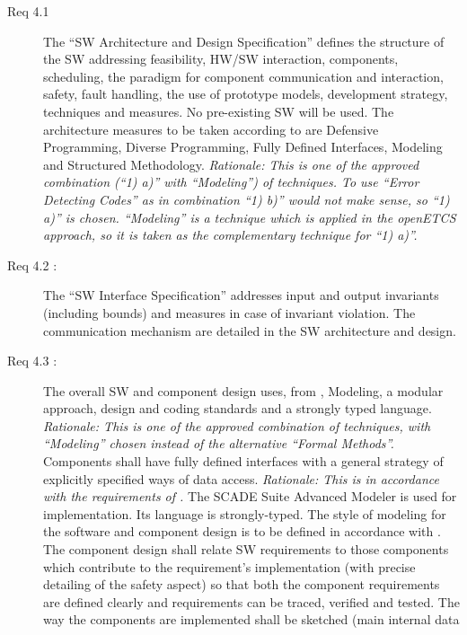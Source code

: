 \documentclass{template/openetcs_article}
\begin{document}
\begin{description}
\item[Req 4.1 {\cite[7.3.4.2 to 7.4.3.17]{EN50128:2011}}] The ``SW
  Architecture and Design Specification'' defines the structure of the
  SW addressing feasibility, HW/SW interaction, components,
  scheduling, the paradigm for component communication and
  interaction, safety, fault handling, the use of prototype models,
  development strategy, techniques and measures. No pre-existing SW
  will be used. The architecture measures to be taken according to
  \cite[A.3]{EN50128:2011} are Defensive Programming, Diverse
  Programming, Fully Defined Interfaces, Modeling and Structured
  Methodology. \emph{Rationale: This is one of the approved
  combination (``1) a)'' with ``Modeling'') of techniques. To use
  ``Error Detecting Codes'' as in combination ``1) b)'' would not make
  sense, so ``1) a)'' is chosen. ``Modeling'' is a technique which is
  applied in the openETCS approach, so it is taken as the
  complementary technique for ``1) a)''.}
\item[Req 4.2 {\cite[7.3.4.18 to 7.4.3.20]{EN50128:2011}}:] The ``SW
  Interface Specification'' addresses input and output invariants
  (including bounds) and measures in case of invariant violation. The
  communication mechanism are detailed in the SW architecture and design.
\item[Req 4.3 {\cite[7.3.4.21 to 7.4.3.24, 7.4.4.1 to
    7.4.4.6]{EN50128:2011}}:] The overall SW and component design
  uses, from \cite[A.4]{EN50128:2011}, Modeling, a modular approach,
  design and coding standards and a strongly typed
  language. \emph{Rationale: This is one of the approved combination
    of techniques, with ``Modeling'' chosen instead of the alternative
    ``Formal Methods''.}  Components shall have fully defined
  interfaces with a general strategy of explicitly specified ways of
  data access. \emph{Rationale: This is in accordance with the
    requirements of \cite[A.20]{EN50128:2011}.}  The SCADE Suite
  Advanced Modeler is used for implementation. Its language is
  strongly-typed.  The style of modeling for the software and
  component design is to be defined in accordance with
  \cite[A.17]{EN50128:2011}. The component design shall relate SW
  requirements to those components which contribute to the
  requirement's implementation (with precise detailing of the safety
  aspect) so that both the component requirements are defined clearly
  and requirements can be traced, verified and tested. The way the
  components are implemented shall be sketched (main internal data

\end{description}
\end{document}
